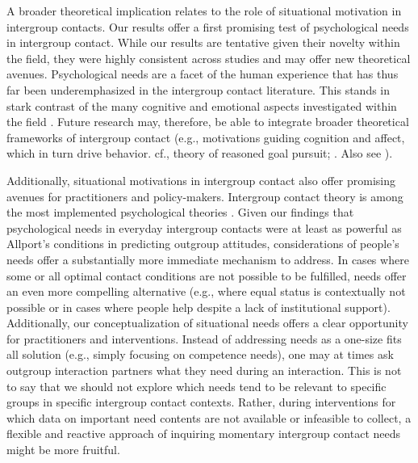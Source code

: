 \documentclass[man, 12pt, a4paper, mask]{apa7}
\theoremstyle{break}
\theoremstyle{plain}
\begin{document}
A broader theoretical implication relates to the role of situational motivation in intergroup contacts. Our results offer a first promising test of psychological needs in intergroup contact. While our results are tentative given their novelty within the field, they were highly consistent across studies and may offer new theoretical avenues. Psychological needs are a facet of the human experience that has thus far been underemphasized in the intergroup contact literature. This stands in stark contrast of the many cognitive \citep[e.g.,][]{Pettigrew1998, Brown2005} and emotional aspects investigated within the field \citep[e.g.,][]{Stephan2008, Paolini2004}. Future research may, therefore, be able to integrate broader theoretical frameworks of intergroup contact (e.g., motivations guiding cognition and affect, which in turn drive behavior. cf., theory of reasoned goal pursuit; \citealp{Ajzen2019}. Also see \citealp{Kreienkamp2022d}). 

Additionally, situational motivations in intergroup contact also offer promising avenues for practitioners and policy-makers. Intergroup contact theory is among the most implemented psychological theories \citep[e.g.,][]{Pettigrew2006, AlRamiah2012a, Reimer2021}. Given our findings that psychological needs in everyday intergroup contacts were at least as powerful as Allport's conditions in predicting outgroup attitudes, considerations of people's needs offer a substantially more immediate mechanism to address. In cases where some or all optimal contact conditions are not possible to be fulfilled, needs offer an even more compelling alternative (e.g., where equal status is contextually not possible or in cases where people help despite a lack of institutional support). Additionally, our conceptualization of situational needs offers a clear opportunity for practitioners and interventions. Instead of addressing needs as a one-size fits all solution (e.g., simply focusing on competence needs), one may at times ask outgroup interaction partners what they need during an interaction. This is not to say that we should not explore which needs tend to be relevant to specific groups in specific intergroup contact contexts. Rather, during interventions for which data on important need contents are not available or infeasible to collect, a flexible and reactive approach of inquiring momentary intergroup contact needs might be more fruitful.
\end{document}
